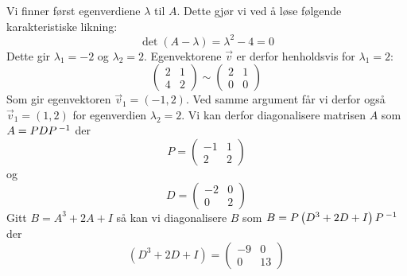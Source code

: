 \oppgave
\deloppgave
Vi finner først egenverdiene $\lambda$ til $A$. Dette gjør vi ved å løse følgende karakteristiske likning:
$$
\det\left(A - \lambda\right) = \lambda^2 - 4 = 0
$$
Dette gir $\lambda_1 = -2$ og $\lambda_2 = 2$. Egenvektorene $\vec{v}$ er derfor henholdsvis for $\lambda_1 = 2$:
$$
\begin{pmatrix}
	2 & 1\\
	4 & 2
\end{pmatrix}
\sim
\begin{pmatrix}
	2 & 1\\
	0 & 0
\end{pmatrix}
$$
Som gir egenvektoren $\vec{v}_1 = (-1, 2)$. Ved samme argument får vi derfor også $\vec{v}_1 = (1, 2)$ for egenverdien $\lambda_2 = 2$. Vi kan derfor diagonalisere matrisen $A$ som $A = PDP\,^{-1}$ der
$$
P = \begin{pmatrix}
	-1 & 1\\
	2 & 2
\end{pmatrix}
$$
og 
$$
D = \begin{pmatrix}
	-2 & 0\\
	0 & 2
\end{pmatrix}
$$
Gitt $B = A^3 + 2A + I$ så kan vi diagonalisere $B$ som $B = P\left(D^3 + 2D + I\right)P\,^{-1}$ der
$$
\left(D^3 + 2D + I\right) = \begin{pmatrix}
	-9 & 0\\
	0 & 13
\end{pmatrix}
$$

